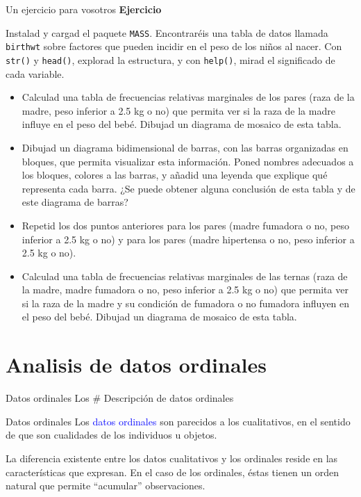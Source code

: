 \documentclass[
  ignorenonframetext,
]{beamer}
\newcommand\blue[1]{\textcolor{blue}{#1}}
\begin{document}
\begin{frame}[fragile]{Un ejercicio para vosotros}
\label{un-ejercicio-para-vosotros}
\textbf{Ejercicio}

Instalad y cargad el paquete \texttt{MASS}. Encontraréis una tabla de
datos llamada \texttt{birthwt} sobre factores que pueden incidir en el
peso de los niños al nacer. Con \texttt{str()} y \texttt{head()},
explorad la estructura, y con \texttt{help()}, mirad el significado de
cada variable.

\begin{itemize}
\item
  Calculad una tabla de frecuencias relativas marginales de los pares
  (raza de la madre, peso inferior a 2.5 kg o no) que permita ver si la
  raza de la madre influye en el peso del bebé. Dibujad un diagrama de
  mosaico de esta tabla.
\item
  Dibujad un diagrama bidimensional de barras, con las barras
  organizadas en bloques, que permita visualizar esta información. Poned
  nombres adecuados a los bloques, colores a las barras, y añadid una
  leyenda que explique qué representa cada barra. ¿Se puede obtener
  alguna conclusión de esta tabla y de este diagrama de barras?
\item
  Repetid los dos puntos anteriores para los pares (madre fumadora o no,
  peso inferior a 2.5 kg o no) y para los pares (madre hipertensa o no,
  peso inferior a 2.5 kg o no).
\item
  Calculad una tabla de frecuencias relativas marginales de las ternas
  (raza de la madre, madre fumadora o no, peso inferior a 2.5 kg o no)
  que permita ver si la raza de la madre y su condición de fumadora o no
  fumadora influyen en el peso del bebé. Dibujad un diagrama de mosaico
  de esta tabla.
\end{itemize}
\end{frame}

\section{Analisis de datos ordinales}\label{analisis-de-datos-ordinales}

\begin{frame}{Datos ordinales}
\label{datos-ordinales}
Los \# Descripción de datos ordinales
\end{frame}

\begin{frame}{Datos ordinales}
\label{datos-ordinales-1}
Los \blue{datos ordinales} son parecidos a los cualitativos, en el
sentido de que son cualidades de los individuos u objetos.

La diferencia existente entre los datos cualitativos y los ordinales
reside en las características que expresan. En el caso de los ordinales,
éstas tienen un orden natural que permite ``acumular'' observaciones.
\end{frame}
\end{document}
